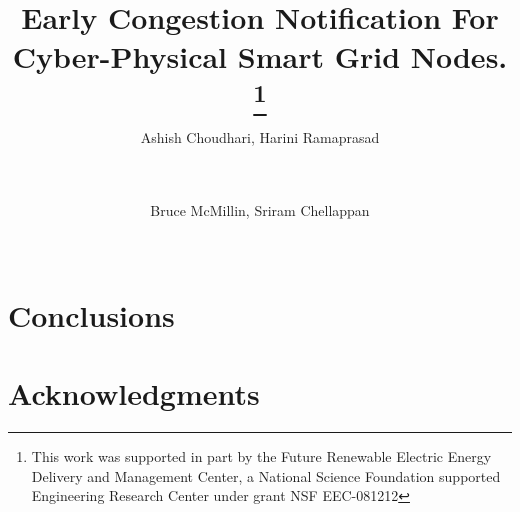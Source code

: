 \documentclass{sig-alternate-ipsn13}
\begin{document}
\title{Early Congestion Notification For Cyber-Physical Smart Grid Nodes. 
\thanks{This work was supported in part by the Future Renewable
Electric Energy Delivery and Management Center, a National Science Foundation
supported Engineering Research Center under grant NSF EEC-081212}}

\author{
\alignauthor
Ashish Choudhari, Harini Ramaprasad \\
       \\
        \\
\and
\alignauthor
Bruce McMillin, Sriram Chellappan \\
       \\
}

\maketitle

\begin{abstract}

\end{abstract}






\section{Conclusions}
\section*{Acknowledgments}


\end{document}
